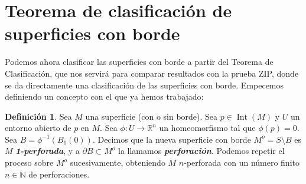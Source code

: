 \documentclass[10pt]{report}
\newcommand{\R}{\mathbb{R}}
\newcommand{\N}{\mathbb{N}}
\DeclareMathOperator{\interior}{Int} %
\newcommand{\enfatiza}[1]{\textbf{\textit{#1}}}
\theoremstyle{definition}
\newtheorem{defin}{Definición}[section]
\begin{document}
\section{Teorema de clasificación de superficies con borde}
Podemos ahora clasificar las superficies con borde a partir del Teorema de Clasificación, que nos servirá para comparar resultados con la prueba ZIP, donde se da directamente una clasificación de las superficies con borde. Empecemos definiendo un concepto con el que ya hemos trabajado:
\begin{defin}%
\label{def:perforacion}
Sea $M$ una superficie (con o sin borde). Sea $p\in \interior (M)$ y $U$ un entorno abierto de $p$ en $M$. Sea $\phi :U\to \R^n$ un homeomorfismo tal que $\phi (p)=0$. Sea $B=\phi ^{-1}(B_1(0))$. Decimos que la nueva superficie con borde $M^o=S\setminus B$ es $M$ \enfatiza{1-perforada}, y a $\partial B\subset M^o$ la llamamos \enfatiza{perforación}. Podemos repetir el proceso sobre $M^o$ sucesivamente, obteniendo $M$ $n$-perforada con un número finito $n\in \N$ de perforaciones.
\end{defin}

\end{document}
